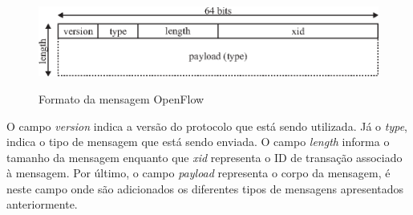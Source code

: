\begin{figure}[H]
  \centering
  \caption{Formato da mensagem OpenFlow}
  \includegraphics[width=.80\textwidth]{images/openflow-message.eps}
  \label{fig:openflow-message}
\end{figure}
\FloatBarrier

O campo \textit{version} indica a versão do protocolo que está sendo utilizada. Já o  \textit{type}, indica o tipo de mensagem que está sendo enviada. O campo \textit{length} informa o tamanho da mensagem enquanto que \textit{xid} representa o ID de transação associado à mensagem. Por último, o campo \textit{payload} representa o corpo da mensagem, é neste campo onde são adicionados os diferentes tipos de mensagens apresentados anteriormente.